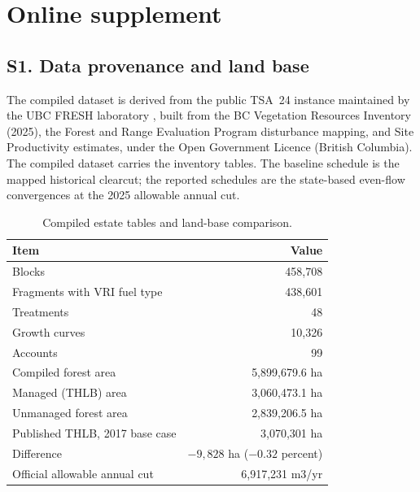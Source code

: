 \section*{Online supplement}

\subsection*{S1. Data provenance and land base}

The compiled dataset is derived from the public TSA~24 instance maintained by the UBC FRESH
laboratory
\citep{femic_tsa24_2026}, built from the BC Vegetation Resources Inventory (2025), the Forest and
Range Evaluation Program disturbance mapping, and Site Productivity estimates, under the Open
Government Licence (British Columbia). The compiled dataset carries the inventory tables.
The baseline schedule is the mapped historical clearcut; the reported schedules are the state-based
even-flow convergences at the 2025 allowable annual cut.

\begin{table}[h]
    \centering
    \small
    \caption{Compiled estate tables and land-base comparison.}
    \label{tab:supp_estate}
    \begin{tabular}{lr}
        \toprule
        Item & Value \\
        \midrule
        Blocks                                        & 458,708 \\
        Fragments with VRI fuel type                  & 438,601 \\
        Treatments                                    & 48 \\
        Growth curves                                 & 10,326 \\
        Accounts                                      & 99 \\
        Compiled forest area                          & 5,899,679.6 ha \\
        Managed (THLB) area                           & 3,060,473.1 ha \\
        Unmanaged forest area                         & 2,839,206.5 ha \\
        Published THLB, 2017 base case                & 3,070,301 ha \\
        Difference                                    & $-9{,}828$ ha ($-0.32$ percent) \\
        Official allowable annual cut                 & 6,917,231 m3/yr \\
        \bottomrule
    \end{tabular}
\end{table}

